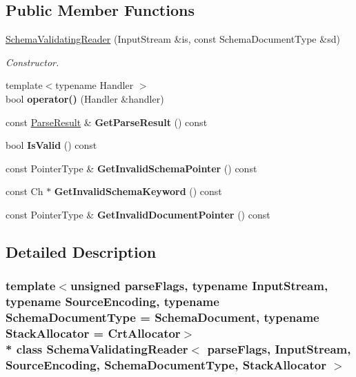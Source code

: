 \subsection*{Public Member Functions}
\begin{DoxyCompactItemize}
\item 
\hyperlink{a00262_ae7945b71687ad3dd13b9c3d096892eac}{Schema\+Validating\+Reader} (Input\+Stream \&is, const Schema\+Document\+Type \&sd)
\begin{DoxyCompactList}\small\item\em Constructor. \end{DoxyCompactList}\item 
{\footnotesize template$<$typename Handler $>$ }\\bool {\bfseries operator()} (Handler \&handler)\hypertarget{a00262_a7135d8d53aacd850fbce2901cca4a4c3}{}\label{a00262_a7135d8d53aacd850fbce2901cca4a4c3}

\item 
const \hyperlink{a00230}{Parse\+Result} \& {\bfseries Get\+Parse\+Result} () const \hypertarget{a00262_aa5445bcfe27eaa55b28961a0ad6e86c1}{}\label{a00262_aa5445bcfe27eaa55b28961a0ad6e86c1}

\item 
bool {\bfseries Is\+Valid} () const \hypertarget{a00262_a01576a2c4ee21a6c73071e5f445dc0bd}{}\label{a00262_a01576a2c4ee21a6c73071e5f445dc0bd}

\item 
const Pointer\+Type \& {\bfseries Get\+Invalid\+Schema\+Pointer} () const \hypertarget{a00262_aaf450fe1f71af00a783d197e81ec6786}{}\label{a00262_aaf450fe1f71af00a783d197e81ec6786}

\item 
const Ch $\ast$ {\bfseries Get\+Invalid\+Schema\+Keyword} () const \hypertarget{a00262_ac040fa8a06b5950b40f907cc5fbec201}{}\label{a00262_ac040fa8a06b5950b40f907cc5fbec201}

\item 
const Pointer\+Type \& {\bfseries Get\+Invalid\+Document\+Pointer} () const \hypertarget{a00262_a8e5fb64a2b4c76572501c3b3e611e0fb}{}\label{a00262_a8e5fb64a2b4c76572501c3b3e611e0fb}

\end{DoxyCompactItemize}


\subsection{Detailed Description}
\subsubsection*{template$<$unsigned parse\+Flags, typename Input\+Stream, typename Source\+Encoding, typename Schema\+Document\+Type = Schema\+Document, typename Stack\+Allocator = Crt\+Allocator$>$\\*
class Schema\+Validating\+Reader$<$ parse\+Flags, Input\+Stream, Source\+Encoding, Schema\+Document\+Type, Stack\+Allocator $>$}


